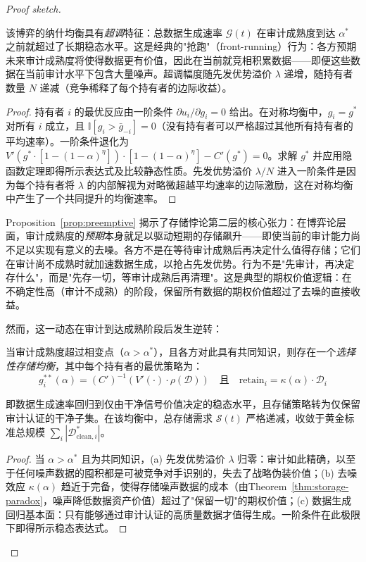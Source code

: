 \documentclass[12pt,a4paper]{ctexart}
\theoremstyle{definition}
\theoremstyle{remark}
\begin{document}
\begin{proof}[Proof sketch]
\begin{proposition}[抢占性数据积累竞赛]
该博弈的纳什均衡具有\textit{超调}特征：总数据生成速率 $\mathcal{G}(t)$ 在审计成熟度到达 $\alpha^*$ 之前就超过了长期稳态水平。这是经典的"抢跑"（front-running）行为：各方预期未来审计成熟度将使得数据更有价值，因此在当前就竞相积累数据——即便这些数据在当前审计水平下包含大量噪声。超调幅度随先发优势溢价 $\lambda$ 递增，随持有者数量 $N$ 递减（竞争稀释了每个持有者的边际收益）。
\end{proposition}

\begin{proof}
持有者 $i$ 的最优反应由一阶条件 $\partial u_i / \partial g_i = 0$ 给出。在对称均衡中，$g_i = g^*$ 对所有 $i$ 成立，且 $\mathbb{I}[g_i > \bar{g}_{-i}] = 0$（没有持有者可以严格超过其他所有持有者的平均速率）。一阶条件退化为 $V'(g^* \cdot [1 - (1-\alpha)^{\eta}]) \cdot [1 - (1-\alpha)^{\eta}] - C'(g^*) = 0$。求解 $g^*$ 并应用隐函数定理即得所示表达式及比较静态性质。先发优势溢价 $\lambda/N$ 进入一阶条件是因为每个持有者将 $\lambda$ 的内部解视为对略微超越平均速率的边际激励，这在对称均衡中产生了一个共同提升的均衡速率。
\end{proof}

Proposition~\ref{prop:preemptive} 揭示了存储悖论第二层的核心张力：在博弈论层面，审计成熟度的\textit{预期}本身就足以驱动短期的存储飙升——即使当前的审计能力尚不足以实现有意义的去噪。各方不是在等待审计成熟后再决定什么值得存储；它们在审计尚不成熟时就加速数据生成，以抢占先发优势。行为不是"先审计，再决定存什么"，而是"先存一切，等审计成熟后再清理"。这是典型的期权价值逻辑：在不确定性高（审计不成熟）的阶段，保留所有数据的期权价值超过了去噪的直接收益。

然而，这一动态在审计到达成熟阶段后发生逆转：

\begin{proposition}[成熟审计下的选择性存储均衡]
\label{prop:mature}
当审计成熟度超过相变点（$\alpha > \alpha^*$），且各方对此具有共同知识，则存在一个\textit{选择性存储均衡}，其中每个持有者的最优策略为：
\begin{equation}
g_i^{**}(\alpha) = (C')^{-1}\left(V'(\cdot) \cdot \rho(\mathcal{D})\right) \quad \text{且} \quad \text{retain}_i = \kappa(\alpha) \cdot \mathcal{D}_i
\end{equation}

即数据生成速率回归到仅由干净信号价值决定的稳态水平，且存储策略转为仅保留审计认证的干净子集。在该均衡中，总存储需求 $\mathcal{S}(t)$ 严格递减，收敛于黄金标准总规模 $\sum_i |\mathcal{D}_{\text{clean}, i}^*|$。
\end{proposition}

\begin{proof}
当 $\alpha > \alpha^*$ 且为共同知识，(a) 先发优势溢价 $\lambda$ 归零：审计如此精确，以至于任何噪声数据的囤积都是可被竞争对手识别的，失去了战略伪装价值；(b) 去噪效应 $\kappa(\alpha)$ 趋近于完备，使得存储噪声数据的成本（由Theorem~\ref{thm:storage-paradox}，噪声降低数据资产价值）超过了"保留一切"的期权价值；(c) 数据生成回归基本面：只有能够通过审计认证的高质量数据才值得生成。一阶条件在此极限下即得所示稳态表达式。
\end{proof}


\end{proof}
\end{document}
